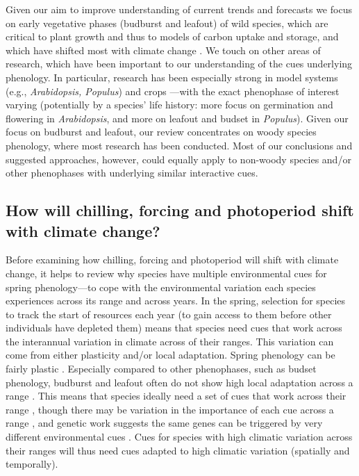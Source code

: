 \documentclass[11pt,letter]{article}
\begin{document}
Given our aim to improve understanding of current trends and forecasts we focus on early vegetative phases (budburst and leafout) of wild species, which are critical to plant growth and thus to models of carbon uptake and storage, and which have shifted most with climate change \citep{Cleland:2007or,IPCC:2014sm}. We touch on other areas of research, which have been important to our understanding of the cues underlying phenology. In particular, research has been especially strong in model systems (e.g., \emph{Arabidopsis, Populus}) and crops \citep{cesaraccio2004}---with the exact phenophase of interest varying (potentially by a species' life history: more focus on germination and flowering in \emph{Arabidopsis}, and more on leafout and budset in \emph{Populus}).  Given our focus on budburst and leafout, our review concentrates on woody species phenology, where most research has been conducted. Most of our conclusions and suggested approaches, however, could equally apply to non-woody species and/or other phenophases with underlying similar interactive cues.\\ 


\subsection{How will chilling, forcing and photoperiod shift with climate change?}
Before examining how chilling, forcing and photoperiod will shift with climate change, it helps to review why species have multiple environmental cues for spring phenology---to cope with the environmental variation each species experiences across its range and across years. In the spring, selection for species to track the start of resources each year (to gain access to them before other individuals have depleted them) means that species need cues that work across the interannual variation in climate across of their ranges. This variation can come from either plasticity and/or local adaptation. Spring phenology can be fairly plastic \citep{vitasselev,kramer2017}. Especially compared to other phenophases, such as budset phenology, budburst and leafout often do not show high local adaptation across a range \citep{mimura2010}. This means that species ideally need a set of cues that work across their range \citep{liepe2016}, though there may be variation in the importance of each cue across a range \citep[e.g., chilling can be higher in coastal versus continental, see][]{campbell1979}, and genetic work suggests the same genes can be triggered by very different environmental cues \citep[e.g.,}][]{simpson2002arab,Stinchcombe:2004ec}. Cues for species with high climatic variation across their ranges will thus need cues adapted to high climatic variation (spatially and temporally).\\
\end{document}
